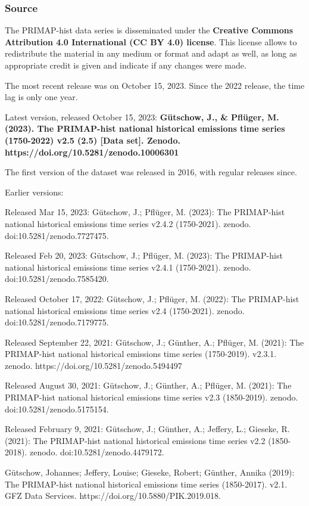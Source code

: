 \documentclass[
  letterpaper,
  DIV=11,
  numbers=noendperiod]{scrartcl}
\begin{document}
\hypertarget{source}{%
\subsubsection{Source}\label{source}}

The PRIMAP-hist data series is disseminated under the \textbf{Creative
Commons Attribution 4.0 International (CC BY 4.0) license}. This license
allows to redistribute the material in any medium or format and adapt as
well, as long as appropriate credit is given and indicate if any changes
were made.

The most recent release was on October 15, 2023. Since the 2022 release,
the time lag is only one year.

Latest version, released October 15, 2023: \textbf{Gütschow, J., \&
Pflüger, M. (2023). The PRIMAP-hist national historical emissions time
series (1750-2022) v2.5 (2.5) {[}Data set{]}. Zenodo.
https://doi.org/10.5281/zenodo.10006301}

The first version of the dataset was released in 2016, with regular
releases since.

Earlier versions:

Released Mar 15, 2023: Gütschow, J.; Pflüger, M. (2023): The PRIMAP-hist
national historical emissions time series v2.4.2 (1750-2021). zenodo.
doi:10.5281/zenodo.7727475.

Released Feb 20, 2023: Gütschow, J.; Pflüger, M. (2023): The PRIMAP-hist
national historical emissions time series v2.4.1 (1750-2021). zenodo.
doi:10.5281/zenodo.7585420.

Released October 17, 2022: Gütschow, J.; Pflüger, M. (2022): The
PRIMAP-hist national historical emissions time series v2.4 (1750-2021).
zenodo. doi:10.5281/zenodo.7179775.

Released September 22, 2021: Gütschow, J.; Günther, A.; Pflüger, M.
(2021): The PRIMAP-hist national historical emissions time series
(1750-2019). v2.3.1. zenodo. https://doi.org/10.5281/zenodo.5494497

Released August 30, 2021: Gütschow, J.; Günther, A.; Pflüger, M. (2021):
The PRIMAP-hist national historical emissions time series v2.3
(1850-2019). zenodo. doi:10.5281/zenodo.5175154.

Released February 9, 2021: Gütschow, J.; Günther, A.; Jeffery, L.;
Gieseke, R. (2021): The PRIMAP-hist national historical emissions time
series v2.2 (1850-2018). zenodo. doi:10.5281/zenodo.4479172.

Gütschow, Johannes; Jeffery, Louise; Gieseke, Robert; Günther, Annika
(2019): The PRIMAP-hist national historical emissions time series
(1850-2017). v2.1. GFZ Data Services.
https://doi.org/10.5880/PIK.2019.018.
\end{document}
